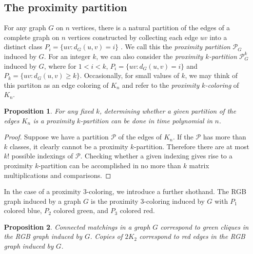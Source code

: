 \documentclass[12pt]{article}
\newtheorem{prop}{Proposition}
\newcommand{\bprop}[1]{\begin{prop}#1\end{prop}}
\theoremstyle{definition}
\begin{document}
\subsection{The proximity partition}
For any graph $G$ on $n$ vertices, there is a natural partition of the edges of a complete graph on $n$ vertices constructed by collecting each edge $uv$ into a distinct class $P_i = \{uv : d_G(u,v) = i\}$ .  We call this the \textit{proximity partition} $\mathcal{P}_G$ induced by $G$.  For an integer $k$, we can also consider the \textit{proximity $k$-partition} $\mathcal{P}^k_G$ induced by $G$, where for $1 < i < k$, $P_i = \{uv : d_G(u,v) = i\}$ and $P_k = \{uv : d_G(u,v) \geq k\}$. Occasionally, for small values of $k$, we may think of this partiton as an edge coloring of $K_n$ and refer to the \textit{proximity $k$-coloring} of $K_n$.  
\bprop{For any fixed $k$, determining whether a given partition of the edges $K_n$ is a proximity $k$-partition can be done in time polynomial in $n$.}

\begin{proof}
Suppose we have a partition $\mathcal{P}$ of the edges of $K_n$. If the $\mathcal{P}$ has more than $k$ classes, it clearly cannot be a proximity $k$-partition. Therefore there are at most $k!$ possible indexings of $\mathcal{P}$.  Checking whether a given indexing gives rise to a proximity $k$-partition can be accomplished in no more than $k$ matrix multiplications and comparisons.  
\end{proof}
In the case of a proximity $3$-coloring, we introduce a further shothand.  The RGB graph induced by a graph $G$ is the proximity $3$-coloring induced by $G$ with $P_1$ colored blue, $P_2$ colored green, and $P_3$ colored red.
\begin{prop}
Connected matchings in a graph $G$ correspond to green cliques in the RGB graph induced by $G$.  Copies of $2K_2$ correspond to red edges in the RGB graph induced by $G$.
\end{prop} 
\end{document}
